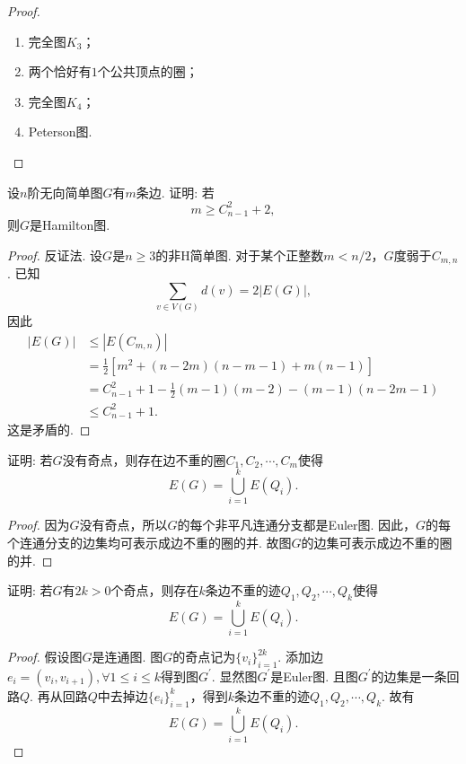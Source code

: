 \documentclass[cn,blue,normal,founder,11pt]{elegantnote}
\begin{document}
\begin{proof}
\begin{enumerate}[(1)]
\item 完全图\(K_3\)；
\item 两个恰好有\(1\)个公共顶点的圈；
\item 完全图\(K_4\)；
\item Peterson图.
\end{enumerate}
\end{proof}

\begin{example}
设\(n\)阶无向简单图\(G\)有\(m\)条边. 证明: 若
\[m\geqslant C_{n-1}^2+2,\]
则\(G\)是Hamilton图.
\end{example}

\begin{proof}
反证法. 设\(G\)是\(n\geqslant 3\)的非H简单图. 对于某个正整数\(m<n/2\)，\(G\)度弱于\(C_{m,n}\). 已知
\[\sum_{v\in V(G)}d(v)=2|E(G)|,\]
因此
\begin{align*}
|E(G)|&\leqslant|E(C_{m,n})|\\
&=\frac{1}{2}[m^2+(n-2m)(n-m-1)+m(n-1)]\\
&=C_{n-1}^2+1-\frac{1}{2}(m-1)(m-2)-(m-1)(n-2m-1)\\
&\leqslant C_{n-1}^2+1.
\end{align*}
这是矛盾的.
\end{proof}

\begin{example}
证明: 若\(G\)没有奇点，则存在边不重的圈\(C_1,C_2,\cdots,C_m\)使得
\[E(G)=\bigcup_{i=1}^k E(Q_i).\]
\end{example}

\begin{proof}
因为\(G\)没有奇点，所以\(G\)的每个非平凡连通分支都是Euler图. 因此，\(G\)的每个连通分支的边集均可表示成边不重的圈的并. 故图\(G\)的边集可表示成边不重的圈的并.
\end{proof}

\begin{example}
证明: 若\(G\)有\(2k>0\)个奇点，则存在\(k\)条边不重的迹\(Q_1,Q_2,\cdots,Q_k\)使得
\[E(G)=\bigcup_{i=1}^k E(Q_i).\]
\end{example}

\begin{proof}
假设图\(G\)是连通图. 图\(G\)的奇点记为\(\{v_i\}_{i=1}^{2k}\). 添加边\(e_i=(v_i,v_{i+1}),\forall 1\leqslant i\leqslant k\)得到图\(G^{\prime}\). 显然图\(G^{\prime}\)是Euler图. 且图\(G^{\prime}\)的边集是一条回路\(Q\). 再从回路\(Q\)中去掉边\(\{e_i\}_{i=1}^k\)，得到\(k\)条边不重的迹\(Q_1,Q_2,\cdots,Q_k\). 故有
\[E(G)=\bigcup_{i=1}^k E(Q_i).\]
\end{proof}
\end{document}
